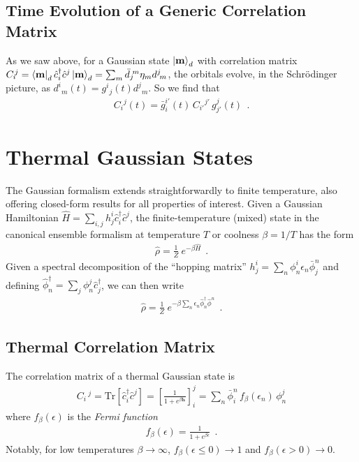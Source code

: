 \documentclass[aps, superscriptaddress, floatfix, onecolumn]{revtex4-2}
\begin{document}
\subsection{Time Evolution of a Generic Correlation Matrix}

As we saw above, for a Gaussian state $\ket{\mathbf{m}}_d$ with correlation matrix $C_i\!^j = \bra{\mathbf{m}}_d \hat{c}^\dagger_i \hat{c}^j \ket{\mathbf{m}}_d = \sum_m \bar{d}_j\!^m \eta_m d^j\!_m$, the orbitals evolve, in the Schr\"odinger picture, as $d^i\!_m(t) = g^i\!_j(t) d^j\!_m$. 
So we find that 
\begin{align}
\boxed{C_i\!^j(t) =  \bar{g}^{i'}_i(t)\, C_{i'}\!^{j'}\, g^j_{j'}(t) } \ \ .
\end{align}


\section{Thermal Gaussian States}

The Gaussian formalism extends straightforwardly to finite temperature, also offering closed-form results for all properties of interest. Given a Gaussian Hamiltonian $\hat{H}= \sum_{i,j} h^i_j \hat{c}^\dagger_i \hat{c}^j$, the finite-temperature (mixed) state in the canonical ensemble formalism at temperature $T$ or coolness $\beta = 1/T$ has the form
\begin{align}
\hat{\rho} = \frac{1}{Z}\ e^{-\beta \hat{H}} \ \ .
\end{align}
Given a spectral decomposition of the ``hopping matrix'' $h^i_j = \sum_n \phi^i_n \epsilon_n \bar{\phi}^n_j$ and defining $\hat{\phi}^\dagger_n = \sum_j \phi^j_n \hat{c}^\dagger_j$, we can then write 
\begin{align}
\hat{\rho} = \frac{1}{Z}\   e^{-\beta \sum_n  \epsilon_n \hat{\phi}^\dagger_n \hat{\phi}^n} \ \ . 
\end{align}

\subsection{Thermal Correlation Matrix}

The correlation matrix of a thermal Gaussian state is 
\begin{align}
    C_i\,^j = \text{Tr}[ \hat{c}^\dagger_i \hat{c}^j ] = \left[ \frac{1}{1+e^{\beta \mathbf{h}}} \right]_i^j  =  \sum_n \bar{\phi}^n_i \, f_\beta(\epsilon_n) \, \phi^j_n 
\end{align}
where $f_\beta(\epsilon)$ is the \emph{Fermi function}
\begin{align}
f_\beta(\epsilon) = \frac{1}{1+e^{\beta \epsilon}} \ \ .
\end{align}
Notably, for low temperatures $\beta \rightarrow \infty$, $f_\beta(\epsilon \leq 0) \rightarrow 1$ and $f_\beta(\epsilon > 0) \rightarrow 0$.
\end{document}
